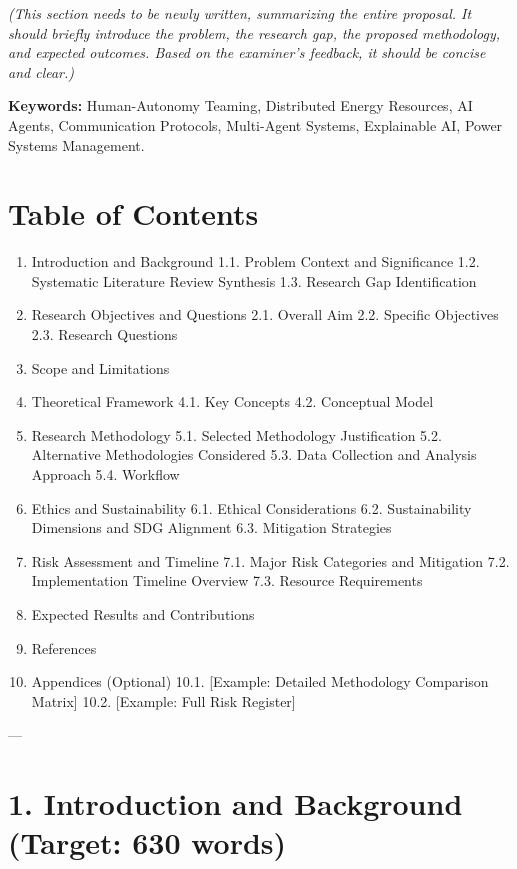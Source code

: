 \documentclass[12pt,a4paper]{article}
\begin{document}
\emph{(This section needs to be newly written, summarizing the entire proposal. It should briefly introduce the problem, the research gap, the proposed methodology, and expected outcomes. Based on the examiner's feedback, it should be concise and clear.)}

\textbf{Keywords:} Human-Autonomy Teaming, Distributed Energy Resources, AI Agents, Communication Protocols, Multi-Agent Systems, Explainable AI, Power Systems Management.

\section{Table of Contents}


\begin{enumerate}
\item  Introduction and Background
    1.1. Problem Context and Significance
    1.2. Systematic Literature Review Synthesis
    1.3. Research Gap Identification
\item  Research Objectives and Questions
    2.1. Overall Aim
    2.2. Specific Objectives
    2.3. Research Questions
\item  Scope and Limitations
\item  Theoretical Framework
    4.1. Key Concepts
    4.2. Conceptual Model
\item  Research Methodology
    5.1. Selected Methodology Justification
    5.2. Alternative Methodologies Considered
    5.3. Data Collection and Analysis Approach
    5.4. Workflow
\item  Ethics and Sustainability
    6.1. Ethical Considerations
    6.2. Sustainability Dimensions and SDG Alignment
    6.3. Mitigation Strategies
\item  Risk Assessment and Timeline
    7.1. Major Risk Categories and Mitigation
    7.2. Implementation Timeline Overview
    7.3. Resource Requirements
\item  Expected Results and Contributions
\item  References
\item Appendices (Optional)
    10.1. [Example: Detailed Methodology Comparison Matrix]
    10.2. [Example: Full Risk Register]
\end{enumerate}

---

\section{1. Introduction and Background (Target: 630 words)}
\end{document}
